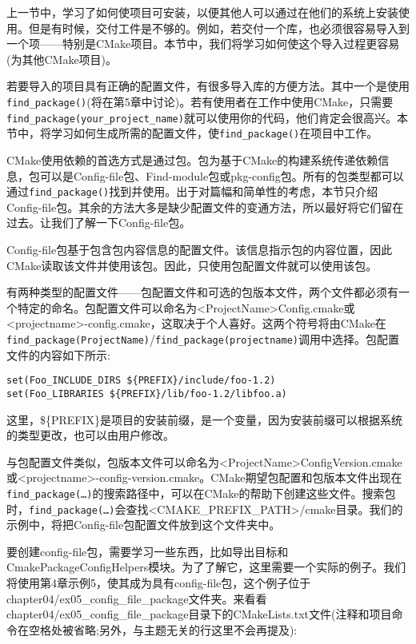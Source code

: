 
上一节中，学习了如何使项目可安装，以便其他人可以通过在他们的系统上安装使用。但是有时候，交付工件是不够的。例如，若交付一个库，也必须很容易导入到一个项——特别是CMake项目。本节中，我们将学习如何使这个导入过程更容易(为其他CMake项目)。

若要导入的项目具有正确的配置文件，有很多导入库的方便方法。其中一个是使用\texttt{find\_package()}(将在第5章中讨论)。若有使用者在工作中使用CMake，只需要\texttt{find\_package(your\_project\_name)}就可以使用你的代码，他们肯定会很高兴。本节中，将学习如何生成所需的配置文件，使\texttt{find\_package()}在项目中工作。

CMake使用依赖的首选方式是通过包。包为基于CMake的构建系统传递依赖信息，包可以是Config-file包、Find-module包或pkg-config包。所有的包类型都可以通过\texttt{find\_package()}找到并使用。出于对篇幅和简单性的考虑，本节只介绍Config-file包。其余的方法大多是缺少配置文件的变通方法，所以最好将它们留在过去。让我们了解一下Config-file包。


Config-file包基于包含包内容信息的配置文件。该信息指示包的内容位置，因此CMake读取该文件并使用该包。因此，只使用包配置文件就可以使用该包。

有两种类型的配置文件——包配置文件和可选的包版本文件，两个文件都必须有一个特定的命名。包配置文件可以命名为<ProjectName>Config.cmake或<projectname>-config.cmake，这取决于个人喜好。这两个符号将由CMake在\texttt{find\_package(ProjectName)}/\texttt{find\_package(projectname)}调用中选择。包配置文件的内容如下所示:

\begin{lstlisting}[style=styleCMake]
set(Foo_INCLUDE_DIRS ${PREFIX}/include/foo-1.2)
set(Foo_LIBRARIES ${PREFIX}/lib/foo-1.2/libfoo.a)
\end{lstlisting}

这里，\$\{PREFIX\}是项目的安装前缀，是一个变量，因为安装前缀可以根据系统的类型更改，也可以由用户修改。

与包配置文件类似，包版本文件可以命名为<ProjectName>ConfigVersion.cmake或<projectname>-config-version.cmake。CMake期望包配置和包版本文件出现在\texttt{find\_package(…)}的搜索路径中，可以在CMake的帮助下创建这些文件。搜索包时，\texttt{find\_package(…)}会查找<CMAKE\_PREFIX\_PATH>/cmake目录。我们的示例中，将把Config-file包配置文件放到这个文件夹中。

要创建config-file包，需要学习一些东西，比如导出目标和CmakePackageConfigHelpers模块。为了了解它，这里需要一个实际的例子。我们将使用第4章示例5，使其成为具有config-file包，这个例子位于chapter04/ex05\_config\_file\_package文件夹。来看看chapter04/ex05\_config\_file\_package目录下的CMakeLists.txt文件(注释和项目命令在空格处被省略;另外，与主题无关的行这里不会再提及):

